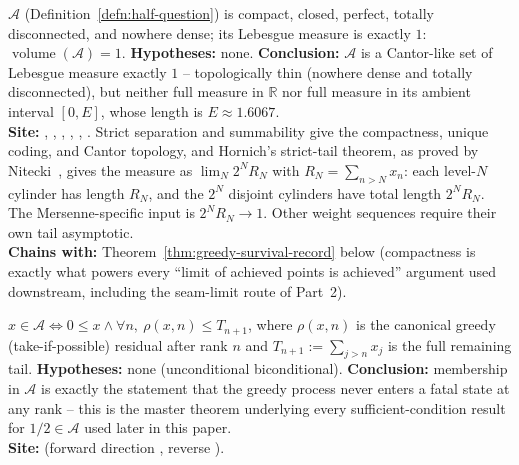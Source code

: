 \begin{thm}
\label{thm:topology}
$\mathcal{A}$ (Definition~\ref{defn:half-question}) is compact, closed, perfect, totally
disconnected, and nowhere dense; its Lebesgue measure is exactly $1$:
$\operatorname{volume}(\mathcal{A}) = 1$. \textbf{Hypotheses:} none. \textbf{Conclusion:}
$\mathcal{A}$ is a Cantor-like set of Lebesgue measure exactly $1$ -- topologically thin
(nowhere dense and totally disconnected), but neither full measure in $\mathbb R$ nor full
measure in its ambient interval $[0,E]$, whose length is $E\approx1.6067$.
 \\
\textbf{Site:} ,
,
,
,
,
. Strict separation and summability give the compactness, unique coding, and Cantor topology, and
Hornich's strict-tail theorem, as proved by Nitecki~\cite[Theorem~4(1), p.~9]{nitecki2013}, gives
the measure as $\lim_N2^NR_N$ with $R_N=\sum_{n>N}x_n$: each level-$N$ cylinder has length $R_N$,
and the $2^N$ disjoint cylinders have total length $2^NR_N$. The Mersenne-specific input is
$2^NR_N\to1$. Other weight sequences require their own tail asymptotic.\\
\textbf{Chains with:} Theorem~\ref{thm:greedy-survival-record} below (compactness is exactly what powers
every ``limit of achieved points is achieved'' argument used downstream, including the seam-limit
route of Part~2).
\end{thm}

\begin{thm}
\label{thm:greedy-survival-record}
$x \in \mathcal{A} \iff 0 \le x \wedge \forall n,\ \rho(x,n) \le T_{n+1}$, where $\rho(x,n)$ is the
canonical greedy (take-if-possible) residual after rank $n$ and $T_{n+1} := \sum_{j>n} x_j$ is the
full remaining tail. \textbf{Hypotheses:} none (unconditional biconditional). \textbf{Conclusion:}
membership in $\mathcal{A}$ is exactly the statement that the greedy process never enters a fatal
state at any rank -- this is the master theorem underlying every sufficient-condition result for
$1/2 \in \mathcal{A}$ used later in this paper.   \\
\textbf{Site:} 
(forward direction ,
reverse ).
\end{thm}

